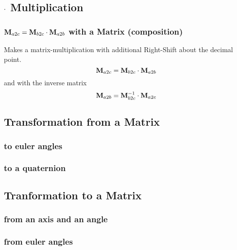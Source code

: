 \subsection{$\cdot$ Multiplication}
\subsubsection*{$\mathbf{M}_{a2c} = \mathbf{M}_{b2c} \cdot \mathbf{M}_{a2b}$ with a Matrix (composition)}
Makes a matrix-multiplication with additional Right-Shift about the decimal point.
\begin{equation}
\mathbf{M}_{a2c} = \mathbf{M}_{b2c} \cdot \mathbf{M}_{a2b}
\end{equation}
and with the inverse matrix
\begin{equation}
\mathbf{M}_{a2b} = \mathbf{M}_{b2c}^{-1} \cdot \mathbf{M}_{a2c}
\end{equation}


\subsection{Transformation from a Matrix}
\subsubsection*{to euler angles}


\subsubsection*{to a quaternion}




\subsection{Tranformation to a Matrix}
\subsubsection*{from an axis and an angle}


\subsubsection*{from euler angles}



